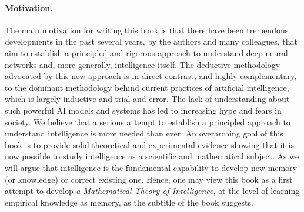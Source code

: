 \documentclass[../../book-main.tex]{subfiles}
\begin{document}
\paragraph{Motivation.}
The main motivation for writing this book is that there have been
tremendous developments in the past several years, by the authors and
many colleagues, that aim to establish a principled and rigorous
approach to understand deep neural networks and, more generally,
intelligence itself. The deductive methodology advocated by this new
approach is in direct contrast, and highly complementary, to the
dominant methodology behind current practices of artificial
intelligence, which is largely inductive and trial-and-error. The
lack of understanding about such powerful AI models and systems has
led to increasing hype and fears in society. We believe that a
serious attempt to establish a principled approach to understand
intelligence is more needed than ever. An overarching goal of this
book is to provide solid theoretical and experimental evidence
showing that it is now possible to study intelligence as a scientific
and mathematical subject. As we will argue that intelligence is the
fundamental capability to  develop new memory (or knowledge) or
correct existing one. Hence, one may view this book as a first
attempt to develop {\em a Mathematical Theory of Intelligence}, at
the level of learning empirical knowledge as memory, as the subtitle
of the book suggests.
\end{document}
